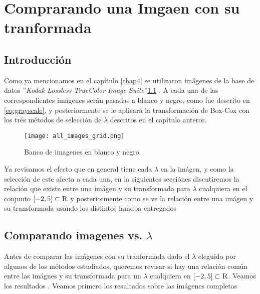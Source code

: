 \chapter{Comprarando una Imgaen con su tranformada}\label{chap5}

\section{Introducci\'on}

    Como ya mencionamos en el cap\'itulo \ref{chap4} se utilizaron im\'agenes de la base de datos ''\textit{Kodak Lossless TrueColor Image Suite}''\ref{fig:rgb2gray_2} \cite{KodakLosslessTrueColorImageSuite}. A cada una de las correspondientes im\'agenes ser\'an pasadas a blanco y negro, como fue descrito en \ref{eq:grayscale}, y posteriormente se le aplicar\'a la transformaci\'on de Box-Cox con los tr\'es m\'etodos de selecci\'on de $\lambda$ descritos en el cap\'itulo anteror.

    \begin{figure}[H]
        \centering
        \texttt{[image: all\_images\_grid.png]}
        \caption{Banco de imagenes en blanco y negro.}
        \label{fig:rgb2gray_2}
    \end{figure}
    
    Ya revisamos el efecto que en general tiene cada $\lambda$ en la im\'agen, y como la selecci\'on de este afecta a cada una, en la siguientes secci\'ones discutiremos la relaci\'on que existe entre una im\'agen y su transformada para $\lambda$ cualquiera en el conjunto $[-2, 5]\subset\textsc{R}$ y posteriormente como se ve la relaci\'on entre una im\'agen y su transformada usando los distintos lamdba entregados 
    
\section[Comparando imagenes vs. lambda]{Comparando imagenes vs. $\lambda$}

    Antes de comparar las im\'agenes con su tranformada dado el $\lambda$ eleguido por algunos de los m\'etodos estudiados, queremos revisar si hay una relaci\'on com\'un entre las im\'agnes y su transformada para un $\lambda$ cualquiera en $[-2, 5]\subset\textsc{R}$. Veamos los resultados . Veamos primero los resultados sobre las im\'agenes completas


